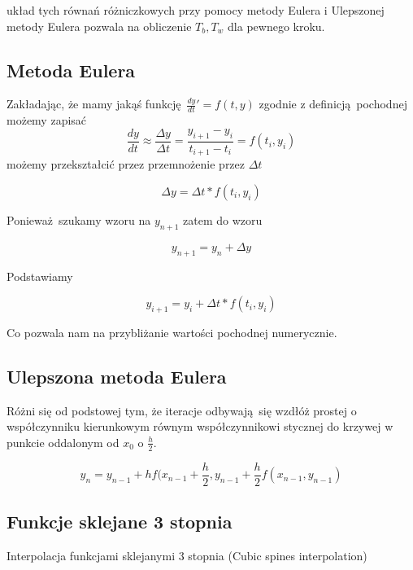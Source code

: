 \documentclass[varwidth,12pt,a4paper]{article}
\begin{document}
układ tych równań różniczkowych przy pomocy metody Eulera i Ulepszonej metody Eulera pozwala na obliczenie $T_b, T_w$ dla pewnego kroku.

\subsection{Metoda Eulera}

Zakładając, że mamy jakąś funkcję $\frac{dy}{dt}' = f(t,y)$
zgodnie z definicją pochodnej możemy zapisać
\begin{equation}
   \frac{dy}{dt} \approx \frac{\Delta y}{\Delta t} = \frac{y_{i+1} - y_i}{t_{i+1} - t_i} = f(t_i, y_i)
\end{equation}
możemy przekształcić przez przemnożenie przez $\Delta t$

\begin{equation}
    \Delta y = \Delta t * f(t_i, y_i)
\end{equation}

Ponieważ szukamy wzoru na $y_{n+1}$ zatem do wzoru

\begin{equation}
    y_{n+1} = y_n + \Delta y
\end{equation}

Podstawiamy

\begin{equation}
    y_{i+1} = y_i + \Delta t * f(t_i, y_i)
\end{equation}

Co pozwala nam na przybliżanie wartości pochodnej numerycznie.

\subsection{Ulepszona metoda Eulera}

Różni się od podstowej tym, że iteracje odbywają się wzdłóż prostej o współczynniku
kierunkowym równym współczynnikowi stycznej do krzywej w punkcie oddalonym od 
$x_0$ o $\frac{h}{2}$.

\begin{equation}
    y_n = y_{n-1} + hf(x_{n-1} + \frac{h}{2}, y_{n-1} + \frac{h}{2} f(x_{n-1}, y_{n-1})
\end{equation}

\subsection{Funkcje sklejane 3 stopnia}

Interpolacja funkcjami sklejanymi 3 stopnia (Cubic spines interpolation)
\end{document}
